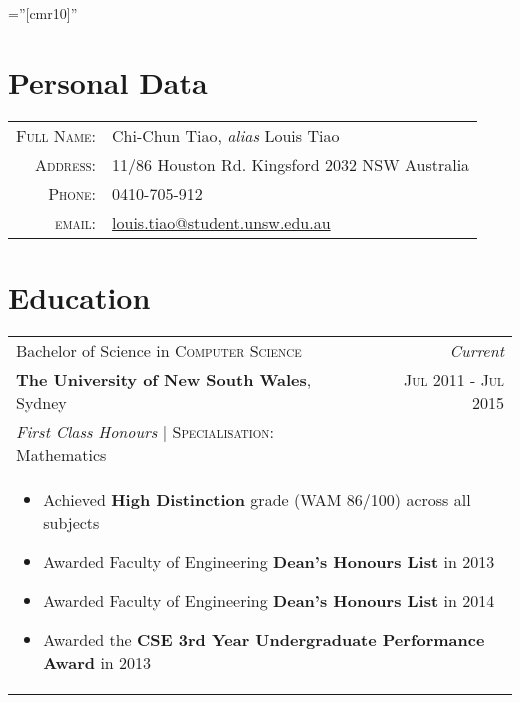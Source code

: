\documentclass[a4paper,10pt]{article} %
\begin{document}
\pagestyle{empty} %

\font\fb=''[cmr10]'' %


\par{\bigskip\par} %

\section{Personal Data}

\begin{tabular}{rl}
\textsc{Full Name:} & Chi-Chun Tiao, \emph{alias} Louis Tiao\\
\textsc{Address:} & 11/86 Houston Rd. Kingsford 2032 NSW Australia \\
\textsc{Phone:} & 0410-705-912 \\
\textsc{email:} & \href{mailto:louis.tiao@student.unsw.edu.au}{louis.tiao@student.unsw.edu.au}
\end{tabular}


\section{Education}

\begin{tabular}{lr}

Bachelor of Science in \textsc{Computer Science}	& \emph{Current}\\
\textbf{The University of New South Wales}, Sydney				&  \textsc{Jul} 2011 - \textsc{Jul} 2015\\ 
 \small\emph{First Class Honours} | \textsc{Specialisation}: Mathematics & \\
 \multicolumn{2}{p{14cm}}{
 \small
 \begin{itemize}
 \item Achieved \textbf{High Distinction} grade (WAM 86/100) across all subjects
 \item Awarded Faculty of Engineering \textbf{Dean's Honours List} in 2013
 \item Awarded Faculty of Engineering \textbf{Dean's Honours List} in 2014
 \item Awarded the \textbf{CSE 3rd Year Undergraduate Performance Award} in 2013
 \end{itemize}
}
\end{tabular}
\end{document}
